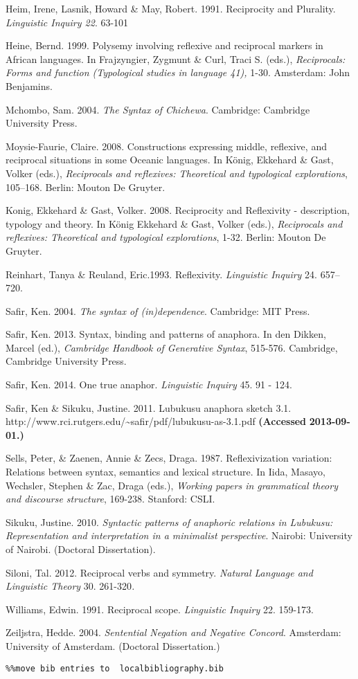 \documentclass[output=paper]{langsci/langscibook}
\begin{document}
Heim, Irene, Lasnik, Howard \& May, Robert. 1991. Reciprocity and Plurality. \textit{Linguistic Inquiry 22}. 63-101

Heine, Bernd. 1999. Polysemy involving reflexive and reciprocal markers in African languages. In Frajzyngier, Zygmunt \& Curl, Traci S. (eds.), \textit{Reciprocals: Forms and function (Typological studies in language 41),} 1-30. Amsterdam: John Benjamins.

Mchombo, Sam. 2004. \textit{The Syntax of Chichewa}. Cambridge: Cambridge University Press. 

Moysie-Faurie, Claire. 2008. Constructions expressing middle, reflexive, and reciprocal situations in some Oceanic languages. In König, Ekkehard \& Gast, Volker (eds.), \textit{Reciprocals and reflexives: Theoretical and typological explorations}, 105–168. Berlin: Mouton De Gruyter.

Konig, Ekkehard \& Gast, Volker. 2008. Reciprocity and Reflexivity - description, typology and theory. In König Ekkehard \& Gast, Volker (eds.), \textit{Reciprocals and reflexives: Theoretical and typological explorations}, 1-32. Berlin: Mouton De Gruyter.

Reinhart, Tanya \& Reuland, Eric.1993. Reﬂexivity. \textit{Linguistic Inquiry} 24. 657–720.

Safir, Ken. 2004. \textit{The syntax of (in)dependence}. Cambridge: MIT Press.

Safir, Ken. 2013. Syntax, binding and patterns of anaphora. In den Dikken, Marcel (ed.), \textit{Cambridge Handbook of Generative Syntax}, 515-576. Cambridge, Cambridge University Press.

Safir, Ken. 2014. One true anaphor. \textit{Linguistic Inquiry} 45. 91 - 124.

Safir, Ken \& Sikuku, Justine. 2011. Lubukusu anaphora sketch 3.1. http://www.rci.rutgers.edu/{\textasciitilde}safir/pdf/lubukusu-as-3.1.pdf \textbf{\textmd{(Accessed}}\textbf{ 2013-09-01.)}

Sells, Peter, \& Zaenen, Annie \& Zecs, Draga. 1987. Reflexivization variation: Relations between syntax, semantics and lexical structure. In Iida, Masayo, Wechsler, Stephen \& Zac, Draga (eds.), \textit{Working papers in grammatical theory and discourse structure}, 169-238. Stanford: CSLI. 

Sikuku, Justine. 2010. \textit{Syntactic patterns of anaphoric relations in Lubukusu: Representation and interpretation in a minimalist perspective}. Nairobi: University of Nairobi. (Doctoral Dissertation).

Siloni, Tal. 2012. Reciprocal verbs and symmetry. \emph{Natural Language and Linguistic Theory} 30. 261-320\emph{.}

Williams, Edwin. 1991. Reciprocal scope. \textit{Linguistic Inquiry} 22. 159-173.

Zeiljstra, Hedde. 2004. \textit{Sentential Negation and Negative Concord}. Amsterdam: University of Amsterdam. (Doctoral Dissertation.)


\begin{verbatim}%%move bib entries to  localbibliography.bib
\end{verbatim}
 

\printbibliography[heading=subbibliography,notkeyword=this]
\end{document}
